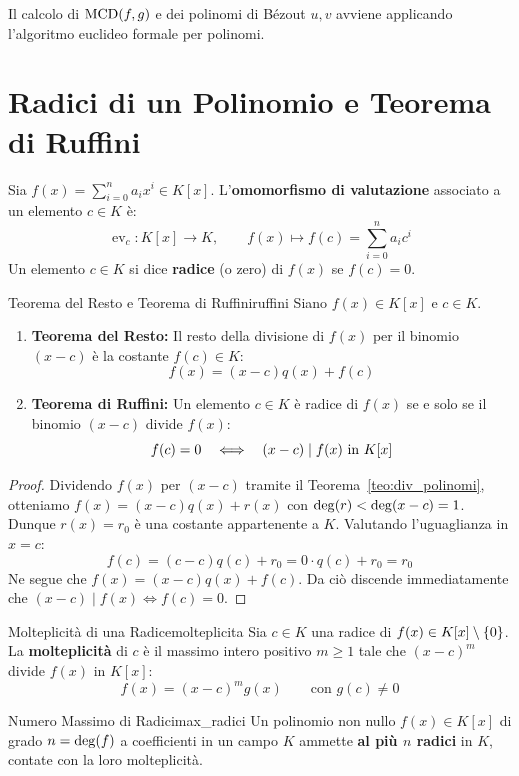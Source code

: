 Il calcolo di $\operatorname{MCD}(f, g)$ e dei polinomi di Bézout $u, v$ avviene applicando l'algoritmo euclideo formale per polinomi.

\section{Radici di un Polinomio e Teorema di Ruffini}

Sia $f(x) = \sum_{i=0}^n a_i x^i \in K[x]$. L'\textbf{omomorfismo di valutazione} associato a un elemento $c \in K$ è:
\[
    \operatorname{ev}_c: K[x] \longrightarrow K, \qquad f(x) \longmapsto f(c) = \sum_{i=0}^n a_i c^i
\]
Un elemento $c \in K$ si dice \textbf{radice} (o zero) di $f(x)$ se $f(c) = 0$.

\begin{teorema}{Teorema del Resto e Teorema di Ruffini}{ruffini}
Siano $f(x) \in K[x]$ e $c \in K$.
\begin{enumerate}
    \item \textbf{Teorema del Resto:} Il resto della divisione di $f(x)$ per il binomio $(x - c)$ è la costante $f(c) \in K$:
    \[
        f(x) = (x - c)q(x) + f(c)
    \]
    \item \textbf{Teorema di Ruffini:} Un elemento $c \in K$ è radice di $f(x)$ se e solo se il binomio $(x - c)$ divide $f(x)$:
    \[
        f(c) = 0 \quad \Longleftrightarrow \quad (x - c) \mid f(x) \text{ in } K[x]
    \]
\end{enumerate}
\end{teorema}
\begin{proof}
Dividendo $f(x)$ per $(x - c)$ tramite il Teorema~\ref{teo:div_polinomi}, otteniamo $f(x) = (x - c)q(x) + r(x)$ con $\operatorname{deg}(r) < \operatorname{deg}(x - c) = 1$.
Dunque $r(x) = r_0$ è una costante appartenente a $K$.
Valutando l'uguaglianza in $x = c$:
\[
    f(c) = (c - c)q(c) + r_0 = 0 \cdot q(c) + r_0 = r_0
\]
Ne segue che $f(x) = (x - c)q(x) + f(c)$. Da ciò discende immediatamente che $(x - c) \mid f(x) \iff f(c) = 0$.
\end{proof}

\begin{definizione}{Molteplicità di una Radice}{molteplicita}
Sia $c \in K$ una radice di $f(x) \in K[x] \setminus \{0\}$. La \textbf{molteplicità} di $c$ è il massimo intero positivo $m \ge 1$ tale che $(x - c)^m$ divide $f(x)$ in $K[x]$:
\[
    f(x) = (x - c)^m g(x) \qquad \text{con } g(c) \neq 0
\]
\end{definizione}

\begin{teorema}{Numero Massimo di Radici}{max_radici}
Un polinomio non nullo $f(x) \in K[x]$ di grado $n = \operatorname{deg}(f)$ a coefficienti in un campo $K$ ammette \textbf{al più $n$ radici} in $K$, contate con la loro molteplicità.
\end{teorema}

